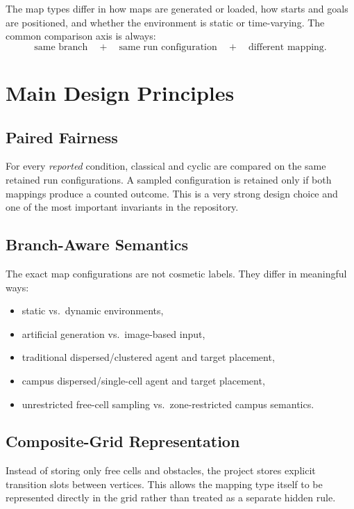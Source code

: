 \documentclass[11pt]{article}
\begin{document}
The map types differ in how maps are generated or loaded, how starts and goals are positioned, and whether the environment is static or time-varying. The common comparison axis is always:
\[
\text{same branch} \quad+\quad \text{same run configuration} \quad+\quad \text{different mapping}.
\]

\section{Main Design Principles}

\subsection{Paired Fairness}

For every \emph{reported} condition, classical and cyclic are compared on the same retained run configurations. A sampled configuration is retained only if both mappings produce a counted outcome. This is a very strong design choice and one of the most important invariants in the repository.

\subsection{Branch-Aware Semantics}

The exact map configurations are not cosmetic labels. They differ in meaningful ways:
\begin{itemize}[leftmargin=2em]
    \item static vs.\ dynamic environments,
    \item artificial generation vs.\ image-based input,
    \item traditional dispersed/clustered agent and target placement,
    \item campus dispersed/single-cell agent and target placement,
    \item unrestricted free-cell sampling vs.\ zone-restricted campus semantics.
\end{itemize}

\subsection{Composite-Grid Representation}

Instead of storing only free cells and obstacles, the project stores explicit transition slots between vertices. This allows the mapping type itself to be represented directly in the grid rather than treated as a separate hidden rule.
\end{document}
